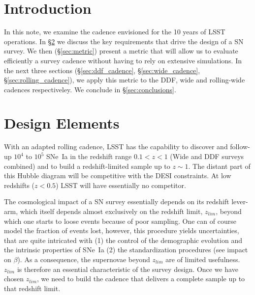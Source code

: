 \documentclass[\docopts]{\docclass}
\begin{document}
\section{Introduction}
\label{sec:intro}


In this note, we examine the cadence envisioned for the 10 years of
LSST operations.  In \S\ref{sec:design_notes} we discuss the key
requirements that drive the design of a SN survey.  We then
(\S\ref{sec:metric}) present a metric that will allow us to evaluate
efficiently a survey cadence without having to rely on extensive
simulations.  In the next three sections (\S\ref{sec:ddf_cadence},
\S\ref{sec:wide_cadence}, \S\ref{sec:rolling_cadence}), we apply
this metric to the  DDF, wide and rolling-wide cadences
respectiveley. We conclude in \S\ref{sec:conclusions}.






\section{Design Elements}
\label{sec:design_notes}

With an adapted rolling cadence, LSST has the capability to discover
and follow-up  $10^4$ to $10^5$ SNe~Ia in the redshift range $0.1 < z <
1$ (Wide and DDF surveys combined) and to build a redshift-limited
sample up to $z \sim 1$. The distant part of this Hubble diagram will
be competitive with the DESI constraints. At low redshifts ($z < 0.5$)
LSST will have essentially no competitor.


The cosmological impact of a SN survey essentially depends on its
redshift lever-arm, which itself depends almost exclusively on the
redshift limit, $z_{lim}$, beyond which one starts to loose events
because of poor sampling.
One can of course model the fraction of events lost, however, this
procedure yields uncertainties, that are quite intricated with (1) the
control of the demographic evolution and the intrinsic properties of
SNe~Ia (2) the standardization procedures (see impact on $\beta$).  As
a consequence, the supernovae beyond $z_{lim}$ are of limited
usefulness.  $z_{lim}$ is therefore an essential characteristic of the
survey design. Once we have chosen $z_{lim}$, we need to build the cadence 
that delivers a complete sample up to that redshift limit. 
\end{document}

